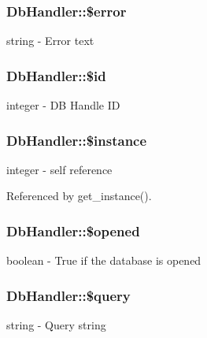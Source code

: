 \subsubsection[{\$error}]{\setlength{\rightskip}{0pt plus 5cm}DbHandler::\$error}\label{classDbHandler_ade79e11156abbfc180864beb5b9df377}
string -\/ Error text 
\subsubsection[{\$id}]{\setlength{\rightskip}{0pt plus 5cm}DbHandler::\$id}\label{classDbHandler_ad38e1c3312815c8ad4093957881092ff}
integer -\/ DB Handle ID 
\subsubsection[{\$instance}]{\setlength{\rightskip}{0pt plus 5cm}DbHandler::\$instance}\label{classDbHandler_a0859a862eac3e8ba14c6d04de0396710}
integer -\/ self reference 

Referenced by get\_\-instance().

\subsubsection[{\$opened}]{\setlength{\rightskip}{0pt plus 5cm}DbHandler::\$opened}\label{classDbHandler_a71e36ffbff0d157b1d91dc000bc6f821}
boolean -\/ True if the database is opened 
\subsubsection[{\$query}]{\setlength{\rightskip}{0pt plus 5cm}DbHandler::\$query}\label{classDbHandler_ad671b5596b37dac6d48a660a07775965}
string -\/ Query string 
